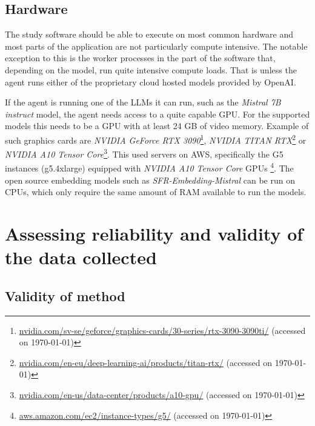 \subsection{Hardware}


The study software should be able to execute on most common hardware and most parts of the application are not particularly compute intensive. The notable exception to this is the worker processes in the  part of the software that, depending on the model, run quite intensive compute loads. That is unless the agent runs either of the proprietary cloud hosted models provided by OpenAI.


If the agent is running one of the \gls{LLM}s it can run, such as the \textit{Mistral 7B instruct} model, the agent needs access to a quite capable GPU. For the supported models this needs to be a GPU with at least 24 GB of video memory. Example of such graphics cards are \textit{NVIDIA GeForce RTX 3090}\footnote{\href{https://www.nvidia.com/sv-se/geforce/graphics-cards/30-series/rtx-3090-3090ti/}{nvidia.com/sv-se/geforce/graphics-cards/30-series/rtx-3090-3090ti/} (accessed on \today)}, \textit{NVIDIA TITAN RTX}\footnote{\href{https://www.nvidia.com/en-eu/deep-learning-ai/products/titan-rtx/}{nvidia.com/en-eu/deep-learning-ai/products/titan-rtx/} (accessed on \today)} or \textit{NVIDIA A10 Tensor Core}\footnote{\href{https://www.nvidia.com/en-us/data-center/products/a10-gpu/}{nvidia.com/en-us/data-center/products/a10-gpu/} (accessed on \today)}. This used servers on AWS, specifically the G5 instances (g5.4xlarge) equipped with \textit{NVIDIA A10 Tensor Core} GPUs \footnote{\href{https://aws.amazon.com/ec2/instance-types/g5/}{aws.amazon.com/ec2/instance-types/g5/} (accessed on \today)}. The open source embedding models such as \textit{SFR-Embedding-Mistral} can be run on CPUs, which only require the same amount of RAM available to run the models.


\section{Assessing reliability and validity of the data collected}
\label{sec:assessingReliability}






\subsection{Validity of method}
\label{sec:validtyOfMethod}


